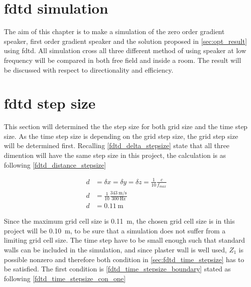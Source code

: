 \section{\gls{fdtd} simulation} \label{sec:fdtd_simulation}
The aim of this chapter is to make a simulation of the zero order gradient speaker, first order gradient speaker and the solution proposed in \autoref{sec:opt_result} using \gls{fdtd}. All simulation cross all three different method of using speaker at low frequency will be compared in both free field and inside a room. The result will be discussed with respect to directionality and efficiency. 

\section{\gls{fdtd} step size}
This section will determined the the step size for both grid size and the time step size. As the time step size is depending on the grid step size, the grid step size will be determined first. Recalling \autoref{fdtd_delta_stepsize} state that all three dimention will have the same step size in this project, the calculation is as following \autoref{fdtd_distance_stepsize} 

\begin{subequations}\label{fdtd_distance_stepsize}
\begin{alignat}{2}
d &= \delta x = \delta y = \delta z= \frac{1}{10} \frac{c}{f_{max}} \label{fdtd_distance_stepsize_1}\\
d &= \frac{1}{10} \frac{\SI{343}{\meter\per\second}}{\SI{300}{\hertz}} \label{fdtd_distance_stepsize_2}\\
d &= \SI{0.11}{\meter} \label{fdtd_distance_stepsize_3}
\end{alignat}
\end{subequations}

    \startexplain
    \stopexplain

Since the maximum grid cell size is \SI{0.11}{\meter}, the chosen grid cell size is in this project will be \SI{0.10}{\meter}, to be sure that a simulation does not suffer from a limiting grid cell size. The time step have to be small enough such that standard walls can be included in the simulation, and since plaster wall is well used, $Z_{1}$ is possible nonzero and therefore both condition in \autoref{sec:fdtd_time_stepsize} has to be satisfied. The first condition is \autoref{fdtd_time_stepsize_boundary} stated as following \autoref{fdtd_time_stepsize_con_one}
    

